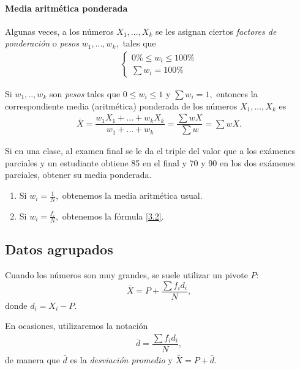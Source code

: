 \paragraph{Media aritmética ponderada}
Algunas veces, a los números $X_{1},...,X_{k}$ se les asignan ciertos \emph{factores de ponderación} o \emph{pesos} $w_{1},...,w_{k},$ tales que \begin{align}
	\begin{cases}
		0\% \leq w_{i}\leq 100\% \\
		\sum w_{i} = 100\%
	\end{cases}
\end{align}


\begin{definicion}
	Si $w_{1},..,w_{k}$ son \emph{pesos} tales que $0\leq w_{i}\leq 1$ y $\sum w_{i}=1,$ entonces la correspondiente media (aritmética) ponderada de los números $X_{1},...,X_{k}$ es
	\begin{align}
		\bar{X}= \dfrac{w_{1}X_{1}+...+w_{k}X_{k}}{w_{1}+...+w_{k}}=\dfrac{\sum wX}{\sum w}=\sum wX.
	\end{align}
\end{definicion}



\begin{ejemplo}
	Si en una clase, al examen final se le da el triple del valor que a los exámenes parciales y un estudiante obtiene 85 en el final y 70 y 90 en los dos exámenes parciales, obtener su media ponderada.
\end{ejemplo}



\begin{enumerate}
	\item Si $w_{i}=\frac{1}{N},$ obtenemos la media aritmética usual. 
	\item Si $w_{i}=\frac{f_{i}}{N},$ obtenemos la fórmula \eqref{3.2}.
\end{enumerate}



\subsection{Datos agrupados}

Cuando los números son muy grandes, se suele utilizar un pivote $P:$ 
$$
\bar{X}=P+\dfrac{\sum f_{i}d_{i}}{N},
$$
donde $d_{i}=X_{i}-P.$

En ocasiones, utilizaremos la notación
\begin{align}
	\bar{d}=\dfrac{\sum f_{i}d_{i}}{N},
\end{align}
de manera que $\bar{d}$ es la \emph{desviación promedio} y $\bar{X}=P+\bar{d}.$



